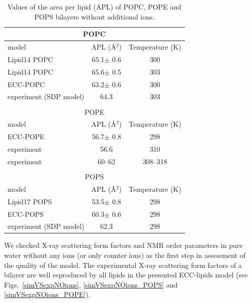 \begin{table}[tb!] 
  \caption{Values of the area per lipid (APL) of POPC, POPE and POPS bilayers without additional ions. \label{tab:apls} 
  } 
  \begin{tabular}{l|c c} 
    \multicolumn{3}{c}{POPC} \\
    \hline 
    model          & APL (Å$^2$)   & Temperature (K) \\ 
    \hline 
    Lipid14 POPC                    & 65.1$\pm$ 0.6  &  300 \\ 
    Lipid14 POPC \citep{dickson14}  & 65.6$\pm$ 0.5  &  303 \\ 
    \hline 
    ECC-POPC                & 63.2$\pm$ 0.6  &  300       \\ 
    \hline 
    experiment (SDP model) \citep{kucerka11} & 64.3  &  303    \\ 
    \hline 
    \\
    \multicolumn{3}{c}{POPE} \\
    \hline 
    model          & APL (Å$^2$)   & Temperature (K) \\ 
    \hline 
    ECC-POPE                 & 56.7$\pm$ 0.8  &  298 \\ 
    \hline 
    experiment   \citep{parsegian89} & 56.6  &  310    \\ 
    experiment   \citep{rappolt03}   & 60--62 &  308--318  \\ 
    \hline 
    \\
    \multicolumn{3}{c}{POPS} \\
    \hline 
    model          & APL (Å$^2$)   & Temperature (K) \\ 
    \hline 
    Lipid17 POPS              & 53.5$\pm$ 0.8  &  298 \\ 
    \hline 
    ECC-POPS                & 60.3$\pm$ 0.6  &  298       \\ 
    \hline 
    experiment (SDP model) \cite{SDP-CHARMM36_comparison_paper_Samuli-knows} & 62.3  &  298    \\ 
    \hline 
  \end{tabular} 
\end{table} 
 
 
We checked X-ray scattering form factors and NMR order parameters 
in pure water without any ions (or only counter ions)
as the first step in assessment of the quality of the model. 
The experimental X-ray scattering form factors 
of a bilayer are well reproduced by all lipids in the presented ECC-lipids model 
(see Figs.~\ref{simVSexpNOions}, \ref{simVSexpNOions_POPS} and \ref{simVSexpNOions_POPE}). 

